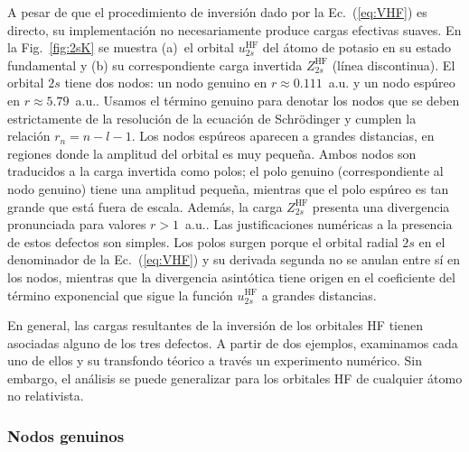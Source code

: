 A pesar de que el procedimiento de inversión dado por la 
Ec.~(\ref{eq:VHF}) es directo, su implementación no necesariamente 
produce cargas efectivas suaves. En la Fig.~\ref{fig:2sK} se muestra 
(a)~el orbital $u_{2s}^{\mathrm{HF}}$ del átomo de potasio en su estado 
fundamental y (b) su correspondiente carga invertida 
$Z_{2s}^{\mathrm{HF}}$ (línea discontinua).
El orbital $2s$ tiene dos nodos: un nodo genuino en 
$r\approx 0.111$~a.u. y un nodo espúreo en $r\approx 5.79$~a.u.. Usamos 
el término genuino para denotar los nodos que se deben estrictamente de 
la resolución de la ecuación de Schr\"odinger y cumplen la relación 
$r_n=n-l-1$. Los nodos espúreos aparecen a grandes distancias, en 
regiones donde la amplitud del orbital es muy pequeña. Ambos nodos son 
traducidos a la carga invertida como polos; el polo genuino 
(correspondiente al nodo genuino) tiene una amplitud pequeña, mientras 
que el polo espúreo es tan grande que está fuera de escala. Además, la 
carga $Z_{2s}^{\mathrm{HF}}$ presenta una divergencia pronunciada para 
valores $r>1$~a.u.. Las justificaciones numéricas a la presencia de 
estos defectos son simples. Los polos surgen porque el orbital radial 
$2s$ en el denominador de la Ec.~(\ref{eq:VHF}) y su derivada segunda no 
se anulan entre sí en los nodos, mientras que la divergencia asintótica 
tiene origen en el coeficiente del término exponencial que sigue la 
función $u_{2s}^{\mathrm{HF}}$ a grandes distancias.



En general, las cargas resultantes de la inversión de los orbitales HF tienen asociadas alguno de los tres defectos. A partir de dos ejemplos, examinamos cada uno de ellos y su transfondo téorico a través un experimento numérico. Sin embargo, el análisis se puede generalizar para los orbitales HF de cualquier átomo no relativista.

\subsubsection{Nodos genuinos}

